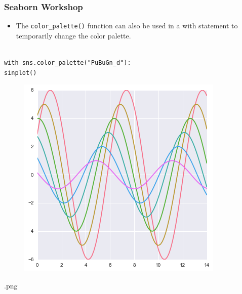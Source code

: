 \documentclass{beamer}
\begin{document}
\begin{frame}[fragile]
	\frametitle{Seaborn Workshop}
	\large
\begin{itemize}
\item The \texttt{color\_palette()} function can also be used in a with statement to temporarily change the color palette.
\end{itemize}
\begin{verbatim}

with sns.color_palette("PuBuGn_d"):
sinplot()
\end{verbatim}

\begin{figure}
	\centering
	\includegraphics[width=0.7\linewidth]{images/color_palettes_67_0}
\end{figure}.png
\end{frame}
\end{document}
